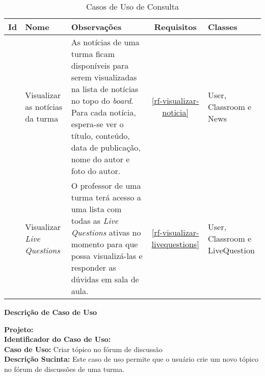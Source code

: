 \begin{table}[H]
	\centering  \vspace{0.5cm} 	\footnotesize 
	\caption{Casos de Uso de Consulta}
	\begin{tabular}{|c|p{2cm}|p{5.7cm}|c|p{3.2cm}|} \hline  \rowcolor[rgb]{0.8,0.8,0.8}
		
		Id & Nome   &  Observações & Requisitos   & Classes  \\ 	\hline	
		
		
		\UC\label{uc-visualizar-noticia} & Visualizar as notícias da turma & As notícias de uma turma ficam disponíveis para serem visualizadas na lista de notícias no topo do \textit{board}. Para cada notícia, espera-se ver o título, conteúdo, data de publicação, nome do autor e foto do autor. &    \ref{rf-visualizar-noticia}        & User, Classroom e News	\\ \hline
		\UC\label{uc-visualizar-livequestions} & Visualizar \textit{Live Questions} & O professor de uma turma terá acesso a uma lista com todas as \textit{Live Questions} ativas no momento para que possa visualizá-las e responder as dúvidas em sala de aula. &    \ref{rf-visualizar-livequestions}       & User, Classroom e LiveQuestion	\\ \hline
		
		
	\end{tabular}
	\label{tabela-board-consulta}
\end{table}

\clearpage
\begin{flushright}    \textbf{Descrição de Caso de Uso}   \end{flushright}         
\noindent \textbf{Projeto:} \imprimirtitulo  \\
\textbf{Identificador do Caso de Uso:} \UC\label{uc-criar-topico} \\
\textbf{Caso de Uso:} Criar tópico no fórum de discussão \\
\noindent \textbf{Descrição Sucinta:} Este caso de uso permite que o usuário crie um novo tópico no fórum de discussões de uma turma.\\

